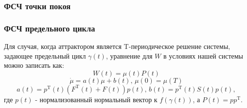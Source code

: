 \documentclass[slidestop,compress,mathserif]{beamer}
\begin{document}
\begin{frame}
\frametitle{ФСЧ точки покоя}
\begin{figure}[h!]
\vspace{-1em}
\vspace{-2em}
\end{figure}
\end{frame}
\begin{frame}
\frametitle{ФСЧ предельного цикла}
\vspace{-1em}
Для случая, когда аттрактором является T-периодическое решение системы, задающее предельный цикл $\gamma (t)$, уравнение для $W$ в условиях нашей системы можно записать как:
\vspace{-1em}
$$W(t) = \mu (t)P(t)$$
\vspace{-2.5em}$$\dot\mu = a(t)\mu + b(t),\, \mu(0) = \mu(T)$$
\vspace{-2em}$$a(t) = p^\mathrm{T}(t)(F^\mathrm{T}(t)+ F(t))p(t),\, b(t) = p^\mathrm{T}(t)S(t)p(t),$$
где $p(t)$ - нормализованный нормальный вектор к $f(\gamma(t))$, а $P(t)=pp^\mathrm{T}$.
\end{frame}
\end{document}
